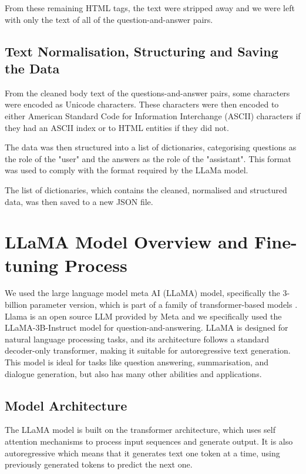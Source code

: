 \documentclass[10pt]{article}
\begin{document}
From these remaining HTML tags, the text were stripped away and we were left with only the
text of all of the question-and-answer pairs.

\subsection{Text Normalisation, Structuring and Saving the Data}

From the cleaned body text of the questions-and-answer pairs, some characters were
encoded as Unicode characters. These characters were then encoded to either American Standard Code for Information Interchange (ASCII)
characters if they had an ASCII index or to HTML entities if they did not.

The data was then structured into a list of dictionaries, categorising questions as the role of the "user"
and the answers as the role of the "assistant". This format was used to comply with the format required by
the LLaMa model.

The list of dictionaries, which contains the cleaned, normalised and structured data, was then saved to
a new JSON file.

\section{LLaMA Model Overview and Fine-tuning Process}

We used the large language model meta AI (LLaMA) model, specifically the 3-billion parameter version,
which is part of a family of transformer-based models \cite{llama3herd}. Llama is an open source LLM provided by Meta
and we specifically used the LLaMA-3B-Instruct model for question-and-answering. LLaMA is designed for natural
language processing tasks, and its architecture follows a standard decoder-only transformer,
making it suitable for autoregressive text generation. This model is ideal for tasks like question answering,
summarisation, and dialogue generation, but also has many other abilities and applications.

\subsection{Model Architecture}
The LLaMA model is built on the transformer architecture, which uses self attention mechanisms to process input
sequences and generate output. It is also autoregressive which means that it generates text one token at a time,
using previously generated tokens to predict the next one.
\end{document}
